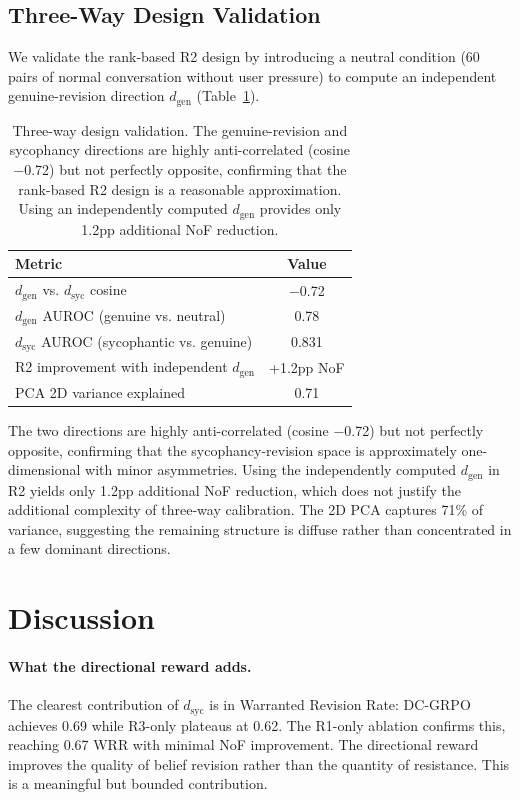 \documentclass[11pt,a4paper]{article}
\newcommand{\dsyc}{$d_{\mathrm{syc}}$}
\newcommand{\dgen}{$d_{\mathrm{gen}}$}
\begin{document}
\subsection{Three-Way Design Validation}

We validate the rank-based R2 design by introducing a neutral condition (60 pairs of normal conversation without user pressure) to compute an independent genuine-revision direction \dgen{} (Table~\ref{tab:threeway}).

\begin{table}[t]
\centering
\small
\begin{tabular}{lc}
\toprule
\textbf{Metric} & \textbf{Value} \\
\midrule
\dgen{} vs. \dsyc{} cosine & $-$0.72 \\
\dgen{} AUROC (genuine vs. neutral) & 0.78 \\
\dsyc{} AUROC (sycophantic vs. genuine) & 0.831 \\
R2 improvement with independent \dgen{} & +1.2pp NoF \\
PCA 2D variance explained & 0.71 \\
\bottomrule
\end{tabular}
\caption{Three-way design validation. The genuine-revision and sycophancy directions are highly anti-correlated (cosine $-$0.72) but not perfectly opposite, confirming that the rank-based R2 design is a reasonable approximation. Using an independently computed \dgen{} provides only 1.2pp additional NoF reduction.}
\label{tab:threeway}
\end{table}

The two directions are highly anti-correlated (cosine $-$0.72) but not perfectly opposite, confirming that the sycophancy-revision space is approximately one-dimensional with minor asymmetries. Using the independently computed \dgen{} in R2 yields only 1.2pp additional NoF reduction, which does not justify the additional complexity of three-way calibration. The 2D PCA captures 71\% of variance, suggesting the remaining structure is diffuse rather than concentrated in a few dominant directions.

\section{Discussion}

\paragraph{What the directional reward adds.} The clearest contribution of \dsyc{} is in Warranted Revision Rate: DC-GRPO achieves 0.69 while R3-only plateaus at 0.62. The R1-only ablation confirms this, reaching 0.67 WRR with minimal NoF improvement. The directional reward improves the quality of belief revision rather than the quantity of resistance. This is a meaningful but bounded contribution.
\end{document}
